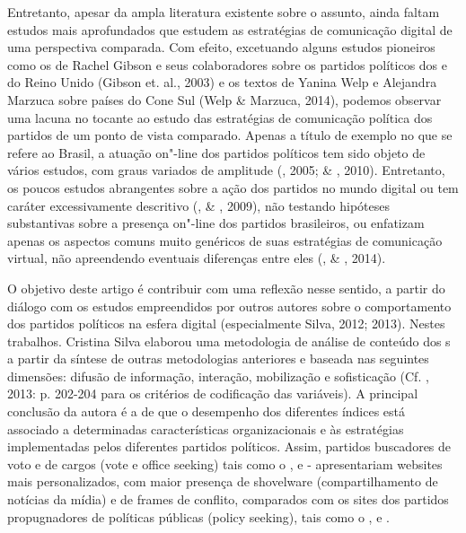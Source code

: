 Entretanto, apesar da ampla literatura existente sobre o assunto, ainda
faltam estudos mais aprofundados que estudem as estratégias de
comunicação digital de uma perspectiva comparada. Com efeito, excetuando
alguns estudos pioneiros como os de Rachel Gibson e seus colaboradores
sobre os partidos políticos dos  e do Reino Unido (Gibson et. al.,
2003) e os textos de Yanina Welp e Alejandra Marzuca sobre países do
Cone Sul (Welp \& Marzuca, 2014), podemos observar uma lacuna no tocante
ao estudo das estratégias de comunicação política dos partidos de um
ponto de vista comparado. Apenas a título de exemplo no que se refere ao
Brasil, a atuação on"-line dos partidos políticos tem sido objeto de
vários estudos, com graus variados de amplitude (, 2005;
 \& , 2010). Entretanto, os poucos estudos abrangentes
sobre a ação dos partidos no mundo digital ou tem caráter excessivamente
descritivo (,  \& , 2009), não testando hipóteses
substantivas sobre a presença on"-line dos partidos brasileiros, ou
enfatizam apenas os aspectos comuns muito genéricos de suas estratégias
de comunicação virtual, não apreendendo eventuais diferenças entre eles
(,  \& , 2014).

O objetivo deste artigo é contribuir com uma reflexão nesse sentido, a
partir do diálogo com os estudos empreendidos por outros autores sobre o
comportamento dos partidos políticos na esfera digital (especialmente
Silva, 2012; 2013). Nestes trabalhos. Cristina Silva elaborou uma
metodologia de análise de conteúdo dos s a partir da síntese de outras
metodologias anteriores e baseada nas seguintes dimensões: difusão de
informação, interação, mobilização e sofisticação (Cf. , 2013: p.
202-204 para os critérios de codificação das variáveis). A principal
conclusão da autora é a de que o desempenho dos diferentes índices está
associado a determinadas características organizacionais e às
estratégias implementadas pelos diferentes partidos políticos. Assim,
partidos buscadores de voto e de cargos (vote e office seeking) tais
como o ,  e - apresentariam websites mais personalizados, com
maior presença de shovelware (compartilhamento de notícias da mídia) e
de frames de conflito, comparados com os sites dos partidos
propugnadores de políticas públicas (policy seeking), tais como o ,
 e .

